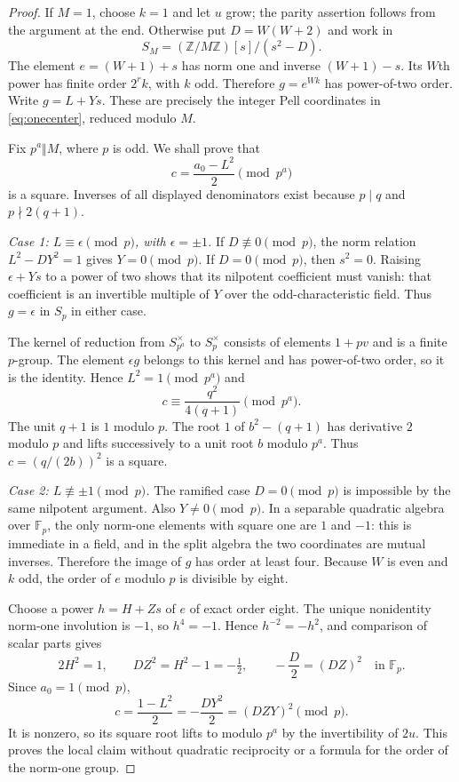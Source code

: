 \documentclass[10pt,letterpaper]{article}
\theoremstyle{definition}\newtheorem{definition}[theorem]{Definition}
\theoremstyle{remark}\newtheorem{remark}[theorem]{Remark}
\newcommand{\Z}{\mathbb Z}\newcommand{\N}{\mathbb N}\newcommand{\Q}{\mathbb Q}
\begin{document}
\begin{proof}
If $M=1$, choose $k=1$ and let $u$ grow; the parity assertion follows
from the argument at the end. Otherwise put $D=W(W+2)$ and work in
\[
 S_M=(\Z/M\Z)[s]/(s^2-D).
\]
The element $e=(W+1)+s$ has norm one and inverse $(W+1)-s$. Its
$W$th power has finite order $2^r k$, with $k$ odd. Therefore
$g=e^{Wk}$ has power-of-two order. Write $g=L+Ys$. These are precisely
the integer Pell coordinates in \eqref{eq:onecenter}, reduced modulo $M$.

Fix $p^a\Vert M$, where $p$ is odd. We shall prove that
\[
 c=\frac{a_0-L^2}{2}\pmod {p^a}
\]
is a square. Inverses of all displayed denominators exist because
$p\mid q$ and $p\nmid2(q+1)$.

\emph{Case 1: $L\equiv\epsilon\pmod p$, with $\epsilon=\pm1$.}
If $D\not\equiv0\pmod p$, the norm relation
$L^2-DY^2=1$ gives $Y=0\pmod p$. If $D=0\pmod p$, then $s^2=0$.
Raising $\epsilon+Ys$ to a power of two shows that its nilpotent
coefficient must vanish: that coefficient is an invertible multiple of
$Y$ over the odd-characteristic field. Thus $g=\epsilon$ in $S_p$
in either case.

The kernel of reduction from $S_{p^a}^{\times}$ to $S_p^{\times}$
consists of elements $1+pv$ and is a finite $p$-group. The element
$\epsilon g$ belongs to this kernel and has power-of-two order, so it
is the identity. Hence $L^2=1\pmod{p^a}$ and
\[
 c\equiv\frac{q^2}{4(q+1)}\pmod {p^a}.
\]
The unit $q+1$ is $1$ modulo $p$. The root $1$ of
$b^2-(q+1)$ has derivative $2$ modulo $p$ and lifts successively to a
unit root $b$ modulo $p^a$. Thus $c=(q/(2b))^2$ is a square.

\emph{Case 2: $L\not\equiv\pm1\pmod p$.}
The ramified case $D=0\pmod p$ is impossible by the same nilpotent
argument. Also $Y\ne0\pmod p$. In a separable quadratic algebra over
$\mathbb F_p$, the only norm-one elements with square one are $1$ and
$-1$: this is immediate in a field, and in the split algebra the two
coordinates are mutual inverses. Therefore the image of $g$ has order
at least four. Because $W$ is even and $k$ odd, the order of $e$ modulo
$p$ is divisible by eight.

Choose a power $h=H+Zs$ of $e$ of exact order eight. The unique
nonidentity norm-one involution is $-1$, so $h^4=-1$. Hence
$h^{-2}=-h^2$, and comparison of scalar parts gives
\[
 2H^2=1,\qquad DZ^2=H^2-1=-\tfrac12,
 \qquad -\frac D2=(DZ)^2
 \quad\text{in }\mathbb F_p.
\]
Since $a_0=1\pmod p$,
\[
 c=\frac{1-L^2}{2}=-\frac{DY^2}{2}=(DZY)^2\pmod p.
\]
It is nonzero, so its square root lifts to modulo $p^a$ by the
invertibility of $2u$. This proves the local claim without quadratic
reciprocity or a formula for the order of the norm-one group.


\end{proof}
\end{document}
